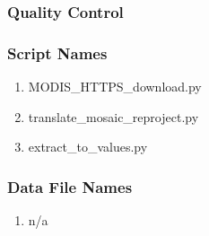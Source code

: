 \subsubsection*{Quality Control}
\subsubsection*{Script Names}
\begin{enumerate}
\item MODIS\_HTTPS\_download.py
\item translate\_mosaic\_reproject.py
\item extract\_to\_values.py
\end{enumerate}
\subsubsection*{Data File Names}
\begin{enumerate}
\item n/a
\end{enumerate}